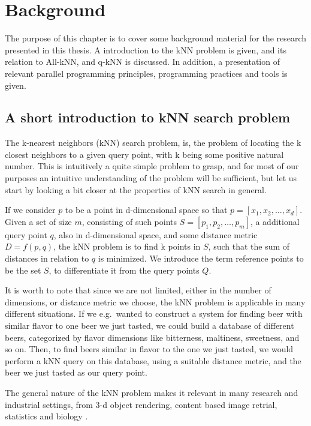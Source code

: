 \chapter{Background}

The purpose of this chapter is to cover some background material for the research presented in this thesis. A introduction to the kNN problem is given, and its relation to All-kNN, and q-kNN is discussed. In addition, a presentation of relevant parallel programming principles, programming practices and tools is given.

\section{A short introduction to kNN search problem} %
\label{a_short_introduction_to_kNN_search_problem}

The k-nearest neighbors (kNN) search problem, is, the problem of locating the k closest neighbors to a given query point, with k being some positive natural number. This is intuitively a quite simple problem to grasp, and for most of our purposes an intuitive understanding of the problem will be sufficient, but let us start by looking a bit closer at the properties of kNN search in general.

If we consider $p$ to be a point in d-dimensional space so that $p = [x_1, x_2,\dots, x_d]$. Given a set of size $m$, consisting of such points $S = [p_1, p_2,\dots, p_m]$, a additional query point $q$, also in d-dimensional space, and some distance metric $D = f(p, q)$, the kNN problem is to find k points in $S$, such that the sum of distances in relation to $q$ is minimized. We introduce the term reference points to be the set $S$, to differentiate it from the query points $Q$. 

It is worth to note that since we are not limited, either in the number of dimensions, or distance metric we choose, the kNN problem is applicable in many different situations. If we e.g.\ wanted to construct a system for finding beer with similar flavor to one beer we just tasted, we could build a database of different beers, categorized by flavor dimensions like bitterness, maltiness, sweetness, and so on. Then, to find beers similar in flavor to the one we just tasted, we would perform a kNN query on this database, using a suitable distance metric, and the beer we just tasted as our query point.

The general nature of the kNN problem makes it relevant in many research and industrial settings, from 3-d object rendering, content based image retrial, statistics and biology \citep[Introduction]{Garcia2010}.

